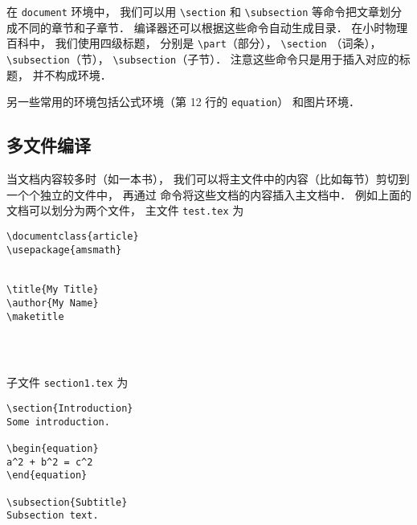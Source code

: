 在 \lstinline|document| 环境中， 我们可以用 \lstinline|\section| 和 \lstinline|\subsection| 等命令把文章划分成不同的章节和子章节． 编译器还可以根据这些命令自动生成目录． 在小时物理百科中， 我们使用四级标题， 分别是 \lstinline|\part|（部分）， \lstinline|\section| （词条）， \lstinline|\subsection|（节）， \lstinline|\subsection|（子节）． 注意这些命令只是用于插入对应的标题， 并不构成环境．

另一些常用的环境包括公式环境（第 12 行的 \lstinline|equation|） 和图片环境．

\subsection{多文件编译}
当文档内容较多时（如一本书）， 我们可以将主文件中的内容（比如每节）剪切到一个个独立的文件中， 再通过 \lstinline|| 命令将这些文档的内容插入主文档中． 例如上面的文档可以划分为两个文件， 主文件 \lstinline|test.tex| 为
\begin{lstlisting}
\documentclass{article}
\usepackage{amsmath}


\title{My Title}
\author{My Name}
\maketitle




\end{lstlisting}

子文件 \lstinline|section1.tex| 为
\begin{lstlisting}
\section{Introduction}
Some introduction.

\begin{equation}
a^2 + b^2 = c^2
\end{equation}

\subsection{Subtitle}
Subsection text.
\end{lstlisting}
